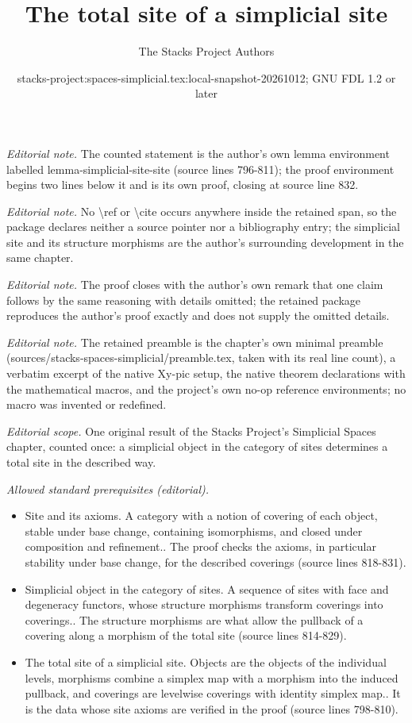 \documentclass{stacks-project}
\title{The total site of a simplicial site}
\author{The Stacks Project Authors}
\date{stacks-project:spaces-simplicial.tex:local-snapshot-20261012; GNU FDL 1.2 or later}
\theoremstyle{plain}
\theoremstyle{definition}
\theoremstyle{remark}
\numberwithin{equation}{subsection}
\begin{document}
\maketitle
\noindent\textit{Editorial note.} The counted statement is the author's own lemma environment labelled lemma-simplicial-site-site (source lines 796-811); the proof environment begins two lines below it and is its own proof, closing at source line 832.\par\medskip
\noindent\textit{Editorial note.} No \textbackslash{}ref or \textbackslash{}cite occurs anywhere inside the retained span, so the package declares neither a source pointer nor a bibliography entry; the simplicial site and its structure morphisms are the author's surrounding development in the same chapter.\par\medskip
\noindent\textit{Editorial note.} The proof closes with the author's own remark that one claim follows by the same reasoning with details omitted; the retained package reproduces the author's proof exactly and does not supply the omitted details.\par\medskip
\noindent\textit{Editorial note.} The retained preamble is the chapter's own minimal preamble (sources/stacks-spaces-simplicial/preamble.tex, taken with its real line count), a verbatim excerpt of the native Xy-pic setup, the native theorem declarations with the mathematical macros, and the project's own no-op reference environments; no macro was invented or redefined.\par\medskip
\noindent\textit{Editorial scope.} One original result of the Stacks Project's Simplicial Spaces chapter, counted once: a simplicial object in the category of sites determines a total site in the described way.\par\medskip
\noindent\textit{Allowed standard prerequisites (editorial).}\begin{itemize}
\item Site and its axioms. A category with a notion of covering of each object, stable under base change, containing isomorphisms, and closed under composition and refinement.. The proof checks the axioms, in particular stability under base change, for the described coverings (source lines 818-831).
\item Simplicial object in the category of sites. A sequence of sites with face and degeneracy functors, whose structure morphisms transform coverings into coverings.. The structure morphisms are what allow the pullback of a covering along a morphism of the total site (source lines 814-829).
\item The total site of a simplicial site. Objects are the objects of the individual levels, morphisms combine a simplex map with a morphism into the induced pullback, and coverings are levelwise coverings with identity simplex map.. It is the data whose site axioms are verified in the proof (source lines 798-810).
\end{itemize}\medskip
\end{document}

